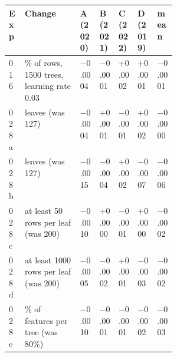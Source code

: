\begin{tabular}{l>{\raggedright\arraybackslash}p{0.33\linewidth}lllll}
\toprule
\textbf{Exp} & \textbf{Change} & \textbf{A (2020)} & \textbf{B (2021)} & \textbf{C (2022)} & \textbf{D (2019)} & \textbf{mean} \\
\midrule
016 & 60\% of rows, 1500 trees, learning rate 0.03 & −0.0004 & −0.0001 & +0.0002 & +0.0001 & −0.0001 \\
028a & 255 leaves (was 127) & −0.0004 & +0.0001 & −0.0001 & +0.0002 & −0.0000 \\
028b & 31 leaves (was 127) & −0.0015 & −0.0004 & +0.0002 & −0.0007 & −0.0006 \\
028c & at least 50 rows per leaf (was 200) & −0.0010 & +0.0000 & −0.0001 & +0.0000 & −0.0002 \\
028d & at least 1000 rows per leaf (was 200) & −0.0005 & −0.0002 & +0.0001 & −0.0003 & −0.0002 \\
028e & 50\% of features per tree (was 80\%) & −0.0010 & −0.0001 & −0.0001 & −0.0002 & −0.0003 \\
\bottomrule
\end{tabular}
